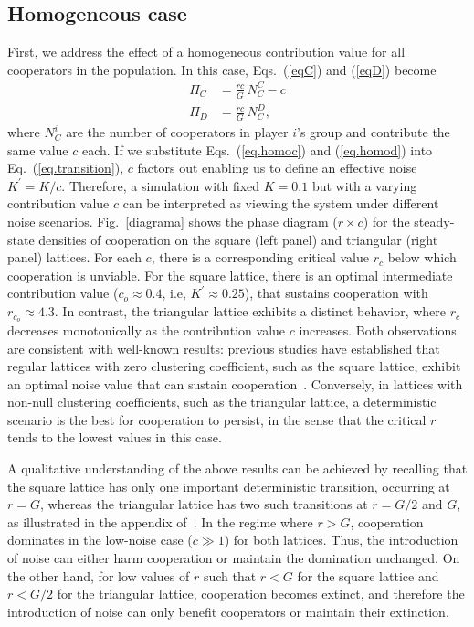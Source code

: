 \documentclass[twocolumn,aps,amsmath,pre,floatfix,superscriptaddress]{revtex4-2}
\begin{document}
\subsection{Homogeneous case}

First, we address the effect of a homogeneous contribution value for all cooperators in the population.  In this case, Eqs.~(\ref{eqC}) and (\ref{eqD}) become
\begin{align}
    \Pi_{C} &= \frac{rc}{G} \, N_C^C  - c \label{eq.homoc}\\ 
    \Pi_{D} &= \frac{rc}{G} \, N_C^D, \label{eq.homod}
\end{align}
where  $N_C^i$ are the number of cooperators in player $ i$'s  group and contribute the same value $c$ each.  If we substitute  Eqs.~(\ref{eq.homoc}) and (\ref{eq.homod}) into  Eq.~(\ref{eq.transition}),  $c$ factors out enabling us to define an effective noise $K^\prime = K/c$.
%
Therefore, a simulation with fixed $K=0.1$ but with a varying contribution value $c$ can be interpreted as viewing the system under different noise scenarios. 
%
Fig.~\ref{diagrama}  shows the phase diagram ($r \times c$) for the steady-state densities of cooperation on the square (left panel) and triangular (right panel) lattices. 
%
For each $c$, there is a corresponding critical value $r_c$ below which cooperation is unviable.
%
For the square lattice, there is an optimal intermediate contribution value ($c_o\approx 0.4$,  i.e, $K^\prime \approx 0.25$), that sustains cooperation with  $r_{c_o} \approx 4.3$. 
%
 In contrast, the triangular lattice exhibits a distinct behavior, where $r_c$ decreases monotonically as the contribution value $c$ increases.
%
Both observations are consistent with  well-known results: 
%
previous studies have established that regular lattices with zero clustering coefficient, such as the square lattice, exhibit an optimal noise value that can sustain cooperation~\cite{Szab__2005,Vukov_2006,perc2013evolutionary}. Conversely, in lattices with non-null clustering coefficients, such as the triangular lattice, a  deterministic scenario  is the best for cooperation to persist, in the sense that the critical  $r$ tends to the lowest values in this case. 
%


 A qualitative understanding of the above results can be achieved by recalling that the square lattice has only one important deterministic transition, occurring at $r=G$, whereas the triangular lattice has two such transitions at $r=G/2$ and $G$, as illustrated in the appendix of~\cite{FLORES2022112744}. 
%
In the regime where $r>G$, cooperation dominates in the low-noise case ($c\gg1$) for both lattices. Thus, the introduction of noise can either harm cooperation or maintain the domination unchanged. On the other hand, for low values of $r$ such that $r<G$ for the square lattice and $r<G/2$ for the triangular lattice, cooperation becomes extinct, and therefore the introduction of noise can only benefit cooperators or maintain their extinction.
%
\end{document}
